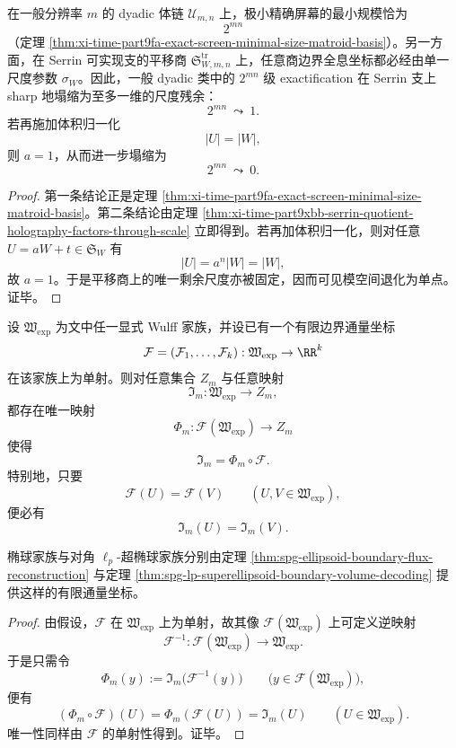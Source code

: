 \begin{corollary}\label{cor:xi-time-part9xbb-sharp-exactification-collapse-to-one-scale}
在一般分辨率 \(m\) 的 dyadic 体链 \(\mathcal U_{m,n}\) 上，极小精确屏幕的最小规模恰为
\[
2^{mn}
\]
（定理 \ref{thm:xi-time-part9fa-exact-screen-minimal-size-matroid-basis}）。另一方面，在 Serrin 可实现支的平移商 \(\mathfrak S_{W,m,n}^{\mathrm{tr}}\) 上，任意商边界全息坐标都必经由单一尺度参数 \(\sigma_W\)。因此，一般 dyadic 类中的 \(2^{mn}\) 级 exactification 在 Serrin 支上 sharp 地塌缩为至多一维的尺度残余：
\[
2^{mn}\ \leadsto\ 1.
\]
若再施加体积归一化
\[
|U|=|W|,
\]
则 \(a=1\)，从而进一步塌缩为
\[
2^{mn}\ \leadsto\ 0.
\]
\end{corollary}
\begin{proof}
第一条结论正是定理 \ref{thm:xi-time-part9fa-exact-screen-minimal-size-matroid-basis}。第二条结论由定理 \ref{thm:xi-time-part9xbb-serrin-quotient-holography-factors-through-scale} 立即得到。若再加体积归一化，则对任意 \(U=aW+t\in\mathfrak S_W\) 有
\[
|U|=a^n|W|=|W|,
\]
故 \(a=1\)。于是平移商上的唯一剩余尺度亦被固定，因而可见模空间退化为单点。证毕。
\end{proof}

\begin{theorem}\label{thm:xi-time-part9xbb-explicit-wulff-finite-flux-coordinate-factorization}
设 \(\mathfrak W_{\mathrm{exp}}\) 为文中任一显式 Wulff 家族，并设已有一个有限边界通量坐标
\[
\mathcal F=(\mathcal F_1,\dots,\mathcal F_k):\mathfrak W_{\mathrm{exp}}\to\RR^k
\]
在该家族上为单射。则对任意集合 \(Z_m\) 与任意映射
\[
\mathfrak I_m:\mathfrak W_{\mathrm{exp}}\to Z_m,
\]
都存在唯一映射
\[
\Phi_m:\mathcal F(\mathfrak W_{\mathrm{exp}})\to Z_m
\]
使得
\[
\mathfrak I_m=\Phi_m\circ \mathcal F.
\]
特别地，只要
\[
\mathcal F(U)=\mathcal F(V)
\qquad
(U,V\in\mathfrak W_{\mathrm{exp}}),
\]
便必有
\[
\mathfrak I_m(U)=\mathfrak I_m(V).
\]

椭球家族与对角 \(\ell_p\)-超椭球家族分别由定理 \ref{thm:spg-ellipsoid-boundary-flux-reconstruction} 与定理 \ref{thm:spg-lp-superellipsoid-boundary-volume-decoding} 提供这样的有限通量坐标。
\end{theorem}
\begin{proof}
由假设，\(\mathcal F\) 在 \(\mathfrak W_{\mathrm{exp}}\) 上为单射，故其像 \(\mathcal F(\mathfrak W_{\mathrm{exp}})\) 上可定义逆映射
\[
\mathcal F^{-1}:\mathcal F(\mathfrak W_{\mathrm{exp}})\to\mathfrak W_{\mathrm{exp}}.
\]
于是只需令
\[
\Phi_m(y):=\mathfrak I_m\bigl(\mathcal F^{-1}(y)\bigr)
\qquad
\bigl(y\in \mathcal F(\mathfrak W_{\mathrm{exp}})\bigr),
\]
便有
\[
(\Phi_m\circ\mathcal F)(U)
=
\Phi_m(\mathcal F(U))
=
\mathfrak I_m(U)
\qquad
(U\in\mathfrak W_{\mathrm{exp}}).
\]
唯一性同样由 \(\mathcal F\) 的单射性得到。证毕。
\end{proof}

